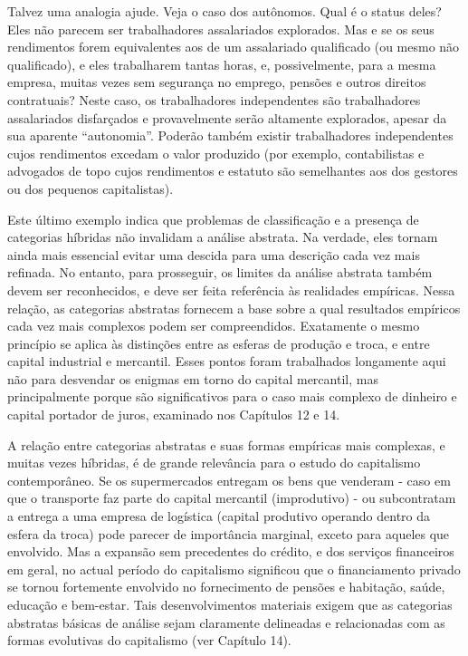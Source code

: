  \par 
Talvez uma analogia ajude. Veja o caso dos autônomos. Qual é o status deles? Eles não parecem ser trabalhadores assalariados explorados. Mas e se os seus rendimentos forem equivalentes aos de um assalariado qualificado (ou mesmo não qualificado), e eles trabalharem tantas horas, e, possivelmente, para a mesma empresa, muitas vezes sem segurança no emprego, pensões e outros direitos contratuais? Neste caso, os trabalhadores independentes são trabalhadores assalariados disfarçados e provavelmente serão altamente explorados, apesar da sua aparente “autonomia”. Poderão também existir trabalhadores independentes cujos rendimentos excedam o valor produzido (por exemplo, contabilistas e advogados de topo cujos rendimentos e estatuto são semelhantes aos dos gestores ou dos pequenos capitalistas).
 \par 
Este último exemplo indica que problemas de classificação e a presença de categorias híbridas não invalidam a análise abstrata. Na verdade, eles tornam ainda mais essencial evitar uma descida para uma descrição cada vez mais refinada. No entanto, para prosseguir, os limites da análise abstrata também devem ser reconhecidos, e deve ser feita referência às realidades empíricas. Nessa relação, as categorias abstratas fornecem a base sobre a qual resultados empíricos cada vez mais complexos podem ser compreendidos. Exatamente o mesmo princípio se aplica às distinções entre as esferas de produção e troca, e entre capital industrial e mercantil. Esses pontos foram trabalhados longamente aqui não para desvendar os enigmas em torno do capital mercantil, mas principalmente porque são significativos para o caso mais complexo de dinheiro e capital portador de juros, examinado nos Capítulos {\color{blue}12} e {\color{blue}14}.
 \par 
A relação entre categorias abstratas e suas formas empíricas mais complexas, e muitas vezes híbridas, é de grande relevância para o estudo do capitalismo contemporâneo. Se os supermercados entregam os bens que venderam - caso em que o transporte faz parte do capital mercantil (improdutivo) - ou subcontratam a entrega a uma empresa de logística (capital produtivo operando dentro da esfera da troca) pode parecer de importância marginal, exceto para aqueles que envolvido. Mas a expansão sem precedentes do crédito, e dos serviços financeiros em geral, no actual período do capitalismo significou que o financiamento privado se tornou fortemente envolvido no fornecimento de pensões e habitação, saúde, educação e bem-estar. Tais desenvolvimentos materiais exigem que as categorias abstratas básicas de análise sejam claramente delineadas e relacionadas com as formas evolutivas do capitalismo (ver Capítulo {\color{blue}14}).
 \par 
